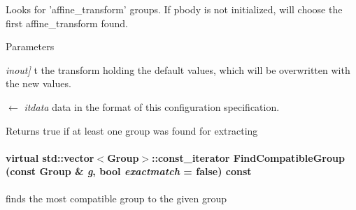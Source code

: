 Looks for 'affine\_\-transform' groups. If pbody is not initialized, will choose the first affine\_\-transform found. 
\begin{DoxyParams}{Parameters}
\item[{\em inout\mbox{]}}]t the transform holding the default values, which will be overwritten with the new values. \item[\mbox{$\leftarrow$} {\em itdata}]data in the format of this configuration specification. \end{DoxyParams}
\begin{DoxyReturn}{Returns}
true if at least one group was found for extracting 
\end{DoxyReturn}
\hypertarget{classOpenRAVE_1_1ConfigurationSpecification_a188304abf23d571f0f340adfdd28e3f0}{
\paragraph[{FindCompatibleGroup}]{\setlength{\rightskip}{0pt plus 5cm}virtual std::vector$<${\bf Group}$>$::const\_\-iterator FindCompatibleGroup (const {\bf Group} \& {\em g}, \/  bool {\em exactmatch} = {\ttfamily false}) const}\hfill}
\label{classOpenRAVE_1_1ConfigurationSpecification_a188304abf23d571f0f340adfdd28e3f0}


finds the most compatible group to the given group 


